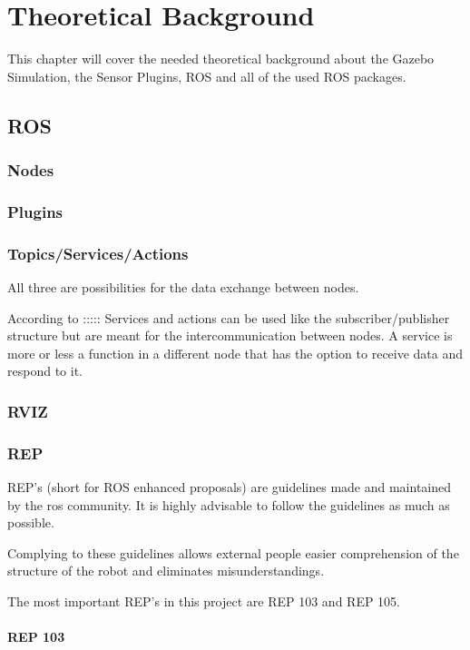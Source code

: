 \chapter{Theoretical Background}
\label{theoretical_background}
This chapter will cover the needed theoretical background about the Gazebo Simulation, the Sensor Plugins, ROS and all of the used ROS packages.

\section{ROS}



\subsection{Nodes}
\subsection{Plugins}
\subsection{Topics/Services/Actions}
All three are possibilities for the data exchange between nodes.

According to :::::
Services and actions can be used like the subscriber/publisher structure but are meant for the intercommunication between nodes. A service is more or less a function in a different node that has the option to receive data and respond to it.
\subsection{RVIZ}


\subsection{REP}
REP's (short for ROS enhanced proposals) are guidelines made and maintained by the ros community. It is highly advisable to follow the guidelines as much as possible.

Complying to these guidelines allows external people easier comprehension of the structure of the robot and eliminates misunderstandings.

The most important REP's in this project are REP 103 and REP 105.
\subsubsection{REP 103}
	
